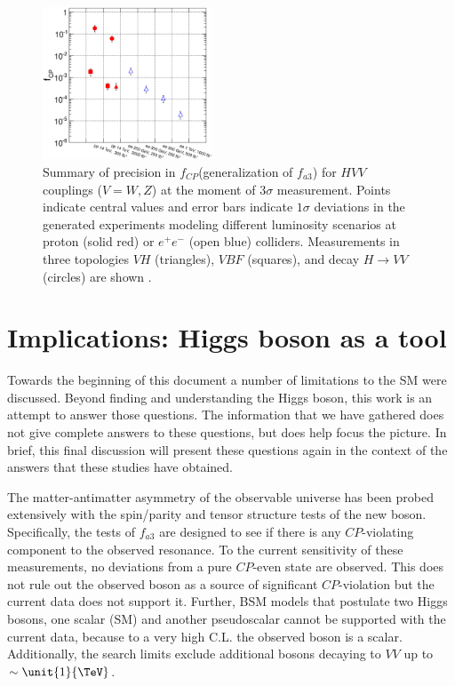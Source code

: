 \begin{figure}
  \centering
    \includegraphics[width=0.45\textwidth]{Conclusion/summary_fcp.eps}
    \caption[Summary of precision in $f_{CP}$(generalization of $f_{a3}$) for $HVV$ couplings ($V = W, Z$) at the moment of $3\sigma$ measurement. Points indicate central values and error bars indicate $1\sigma$ deviations in the generated experiments modeling different luminosity scenarios at proton (solid red) or $e^{+}e^{-}$ (open blue) colliders. Measurements in three topologies $VH$ (triangles), $VBF$ (squares), and decay $H \to VV$ (circles) are shown.]{
       Summary of precision in $f_{CP}$(generalization of $f_{a3}$) for $HVV$ couplings ($V = W, Z$) at the moment of $3\sigma$ measurement. Points indicate central values and error bars indicate $1\sigma$ deviations in the generated experiments modeling different luminosity scenarios at proton (solid red) or $e^{+}e^{-}$ (open blue) colliders. Measurements in three topologies $VH$ (triangles), $VBF$ (squares), and decay $H \to VV$ (circles) are shown \cite{Anderson:2013afp}.
      \label{fig:fa3_project}
      }

\end{figure}

\section{Implications: Higgs boson as a tool}

Towards the beginning of this document a number of limitations to the SM were discussed. Beyond finding and understanding the Higgs boson, this work is an attempt to answer those questions. The information that we have gathered does not give complete answers to these questions, but does help focus the picture. In brief, this final discussion will present these questions again in the context of the answers that these studies have obtained.

The matter-antimatter asymmetry of the observable universe has been probed extensively with the spin/parity and tensor structure tests of the new boson. Specifically, the tests of $f_{a3}$ are designed to see if there is any $CP$-violating component to the observed resonance. To the current sensitivity of these measurements, no deviations from a pure $CP$-even state are observed. This does not rule out the observed boson as a source of significant $CP$-violation but the current data does not support it. Further, BSM models that postulate two Higgs bosons, one scalar (SM) and another pseudoscalar cannot be supported with the current data, because to a very high C.L. the observed boson is a scalar. Additionally, the search limits exclude additional bosons decaying to $VV$ up to $\sim\unit{1}{\TeV}$.

